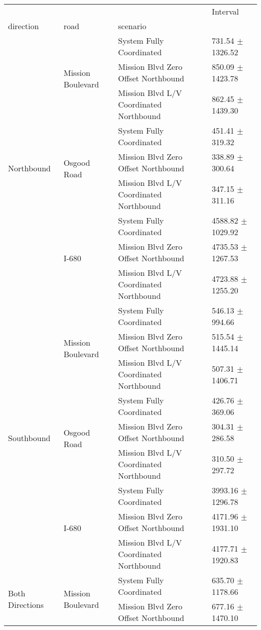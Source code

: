 \begin{tabular}{llll}
\toprule
 &  &  & Interval \\
direction & road & scenario &  \\
\midrule
\multirow[t]{9}{*}{Northbound} & \multirow[t]{3}{*}{Mission Boulevard} & System Fully Coordinated & 731.54 $\pm$ 1326.52 \\
 &  & Mission Blvd Zero Offset Northbound & 850.09 $\pm$ 1423.78 \\
 &  & Mission Blvd L/V Coordinated Northbound & 862.45 $\pm$ 1439.30 \\
 & \multirow[t]{3}{*}{Osgood Road} & System Fully Coordinated & 451.41 $\pm$ 319.32 \\
 &  & Mission Blvd Zero Offset Northbound & 338.89 $\pm$ 300.64 \\
 &  & Mission Blvd L/V Coordinated Northbound & 347.15 $\pm$ 311.16 \\
 & \multirow[t]{3}{*}{I-680} & System Fully Coordinated & 4588.82 $\pm$ 1029.92 \\
 &  & Mission Blvd Zero Offset Northbound & 4735.53 $\pm$ 1267.53 \\
 &  & Mission Blvd L/V Coordinated Northbound & 4723.88 $\pm$ 1255.20 \\
\multirow[t]{9}{*}{Southbound} & \multirow[t]{3}{*}{Mission Boulevard} & System Fully Coordinated & 546.13 $\pm$ 994.66 \\
 &  & Mission Blvd Zero Offset Northbound & 515.54 $\pm$ 1445.14 \\
 &  & Mission Blvd L/V Coordinated Northbound & 507.31 $\pm$ 1406.71 \\
 & \multirow[t]{3}{*}{Osgood Road} & System Fully Coordinated & 426.76 $\pm$ 369.06 \\
 &  & Mission Blvd Zero Offset Northbound & 304.31 $\pm$ 286.58 \\
 &  & Mission Blvd L/V Coordinated Northbound & 310.50 $\pm$ 297.72 \\
 & \multirow[t]{3}{*}{I-680} & System Fully Coordinated & 3993.16 $\pm$ 1296.78 \\
 &  & Mission Blvd Zero Offset Northbound & 4171.96 $\pm$ 1931.10 \\
 &  & Mission Blvd L/V Coordinated Northbound & 4177.71 $\pm$ 1920.83 \\
\multirow[t]{9}{*}{Both Directions} & \multirow[t]{3}{*}{Mission Boulevard} & System Fully Coordinated & 635.70 $\pm$ 1178.66 \\
 &  & Mission Blvd Zero Offset Northbound & 677.16 $\pm$ 1470.10 \\

\end{tabular}
